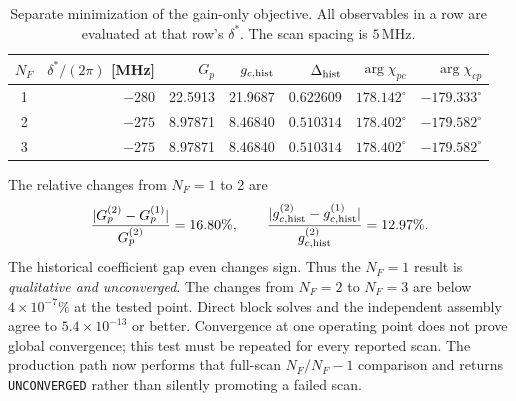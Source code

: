 \documentclass[11pt,a4paper]{article}
\newcommand{\MHz}{\,\mathrm{MHz}}
\begin{document}
\begin{table}[ht]
\centering
\caption{Separate minimization of the gain-only objective. All
observables in a row are evaluated at that row's $\delta^*$. The scan spacing
is $5\MHz$.}
\label{tab:legacy-delta-star}
\small
\begin{tabular}{c r r r r r r}
\toprule
$N_F$ & $\delta^*/(2\pi)$ [MHz] & $G_p$ & $g_{c,{\rm hist}}$ &
$\Delta_{\rm hist}$ &
$\arg\chi_{pc}$ & $\arg\chi_{cp}$\\
\midrule
1 & $-280$ & 22.5913 & 21.9687 & $0.622609$ &
$178.142^\circ$ & $-179.333^\circ$\\
2 & $-275$ & 8.97871 & 8.46840 & $0.510314$ &
$178.402^\circ$ & $-179.582^\circ$\\
3 & $-275$ & 8.97871 & 8.46840 & $0.510314$ &
$178.402^\circ$ & $-179.582^\circ$\\
\bottomrule
\end{tabular}
\end{table}

The relative changes from $N_F=1$ to 2 are
\[
\frac{|G_p^{(2)}-G_p^{(1)}|}{G_p^{(2)}}=16.80\%,
\qquad
\frac{|g_{c,{\rm hist}}^{(2)}-g_{c,{\rm hist}}^{(1)}|}
{g_{c,{\rm hist}}^{(2)}}=12.97\%.
\]
The historical coefficient gap even changes sign. Thus the $N_F=1$ result is
\emph{qualitative and unconverged}. The changes from $N_F=2$ to $N_F=3$ are
below $4\times10^{-7}\%$ at the tested point. Direct block solves and the
independent assembly agree to $5.4\times10^{-13}$ or better. Convergence at
one operating point does not prove global convergence; this test must be
repeated for every reported scan. The production path now performs that
full-scan $N_F/N_F-1$ comparison and returns \texttt{UNCONVERGED} rather than
silently promoting a failed scan.
\end{document}

